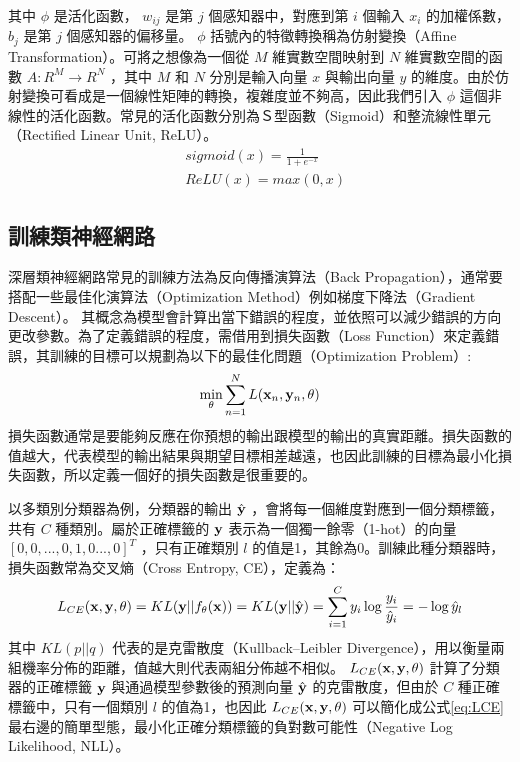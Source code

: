 其中 $ \phi $ 是活化函數， $ w_{ij} $ 是第 $ j $ 個感知器中，對應到第 $ i $ 個輸入 $ x_i $ 的加權係數， $ b_j $ 是第 $ j $ 個感知器的偏移量。 $ \phi $ 括號內的特徵轉換稱為仿射變換（Affine
Transformation）。可將之想像為一個從 $ M $ 維實數空間映射到 $ N $ 維實數空間的函數 $ A:
R^M \rightarrow R^N $ ，其中 $ M $ 和 $ N $ 分別是輸入向量 $ x $ 與輸出向量 $ y $ 的維度。由於仿
射變換可看成是一個線性矩陣的轉換，複雜度並不夠高，因此我們引入 $ \phi $ 這個非線性的活化函數。常見的活化函數分別為Ｓ型函數（Sigmoid）和整流線性單元（Rectified Linear Unit, ReLU）。
\begin{equation}
\begin{aligned}
&sigmoid(x) = \frac{1}{1 + e^{-x}}
\\
&ReLU(x) = max( 0 , x )
\end{aligned}
\end{equation}


\subsection{訓練類神經網路}
\label{ch2_train_DNN}
深層類神經網路常見的訓練方法為反向傳播演算法（Back
Propagation）\cite{rumelhart1988learning}，通常要搭配一些最佳化演算法（Optimization
Method）例如梯度下降法（Gradient Descent）。
其概念為模型會計算出當下錯誤的程度，並依照可以減少錯誤的方向更改參數。為了定義錯誤的程度，需借用到損失函數（Loss
Function）來定義錯誤，其訓練的目標可以規劃為以下的最佳化問題（Optimization
Problem）:
\begin{equation}
\min_{\theta}{ \sum_{n=1}^{N}{ {L( \bold{x}_n , \bold{y}_n ,\theta)}}}
\end{equation}
損失函數通常是要能夠反應在你預想的輸出跟模型的輸出的真實距離。損失函數的值越大，代表模型的輸出結果與期望目標相差越遠，也因此訓練的目標為最小化損失函數，所以定義一個好的損失函數是很重要的。

以多類別分類器為例，分類器的輸出 $ \hat{\bold{y}} $ ，會將每一個維度對應到一個分類標籤，共有 $ C $ 種類別。屬於正確標籤的 $ \bold{y} $ 表示為一個獨一餘零（1-hot）的向量 $ [0, 0 , ... , 0 , 1 , 0 ... , 0]^T  $ ，只有正確類別  $ l $  的值是1，其餘為0。訓練此種分類器時，損失函數常為交叉熵（Cross Entropy, CE），定義為：
\begin{equation} 
\label{eq:LCE}
L_{CE}(\bold{x} , \bold{y} , \theta) = KL( \bold{y} || f_{\theta}(\bold{x}) ) = KL(\bold{y} || \hat{\bold{y} }) = \sum_{i = 1}^{C} y_i \log{ \frac{y_i}{\hat{y}_i} } = - \log \hat{y}_{l} 
\end{equation}
其中 $ KL(p||q) $ 代表的是克雷散度（Kullback–Leibler Divergence），用以衡量兩組機率分佈的距離，值越大則代表兩組分佈越不相似。 $ L_{CE}(\bold{x} , \bold{y} , \theta)  $ 計算了分類器的正確標籤 $ \bold{y} $ 與通過模型參數後的預測向量 $ \hat{\bold{y}} $ 的克雷散度，但由於 $ C $ 種正確標籤中，只有一個類別 $ l $ 的值為1，也因此 $ L_{CE}(\bold{x} , \bold{y} , \theta)  $ 可以簡化成公式\ref{eq:LCE}最右邊的簡單型態，最小化正確分類標籤的負對數可能性（Negative Log Likelihood, NLL）。

